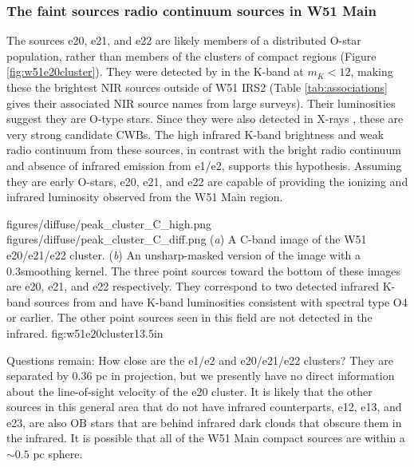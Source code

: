 \subsubsection{The faint sources radio continuum sources in W51 Main}

The sources e20, e21, and e22 are likely members of a distributed O-star
population, rather than members of the clusters of compact \hii regions (Figure
\ref{fig:w51e20cluster}).  They were detected by \citet{Goldader1994a} in the
K-band at $m_K < 12$, making these the brightest NIR sources outside of W51
IRS2 (Table \ref{tab:associations} gives their associated NIR source names
from large surveys).  Their luminosities suggest they are O-type stars.  Since
they were also detected in X-rays \citep{Townsley2014a}, these are very strong
candidate CWBs.  The high infrared K-band brightness and weak radio
continuum from these sources, in contrast with the bright radio continuum and
absence of infrared emission from e1/e2, supports this hypothesis.  
Assuming they are early O-stars, e20, e21, and e22 are capable of providing the
ionizing and infrared luminosity observed from the W51 Main \hii region.

\FigureTwo
{figures/diffuse/peak_cluster_C_high.png}
{figures/diffuse/peak_cluster_C_diff.png}
{({\it a}) A C-band image of the W51 e20/e21/e22 cluster.
({\it b}) An unsharp-masked version of the image with a 0.3\arcsec smoothing
kernel. 
The three point sources toward the bottom of these images are e20, e21, and e22
respectively.  They correspond to two detected infrared K-band sources from
\citet{Goldader1994a} and have K-band luminosities consistent with spectral
type O4 or earlier.  The other point sources seen in this field are not detected
in the infrared.
}
{fig:w51e20cluster}{1}{3.5in}


Questions remain: %
How close are the e1/e2 and e20/e21/e22 clusters?  They are separated by 0.36
pc in projection, but we presently have no direct information about the
line-of-sight velocity of the e20 cluster.    It is likely that the other
sources in this general area that do not have infrared counterparts, e12, e13,
and e23, are also OB stars that are behind infrared dark clouds that obscure
them in the infrared.  It is possible that all of the W51 Main compact sources
are within a $\sim 0.5$ pc sphere.



